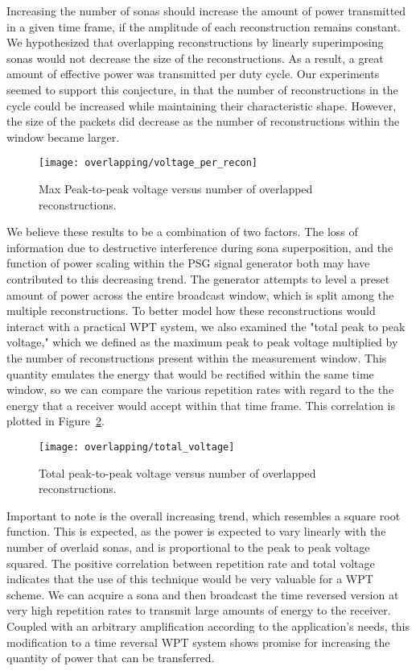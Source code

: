 Increasing the number of sonas should increase the amount of power transmitted in a given time frame, if the amplitude of each reconstruction remains constant. We hypothesized that overlapping reconstructions by linearly superimposing sonas would not decrease the size of the reconstructions. As a result, a great amount of effective power was transmitted per duty cycle. Our experiments seemed to support this conjecture, in that the number of reconstructions in the cycle could be increased while maintaining their characteristic shape. However, the size of the packets did decrease as the number of reconstructions within the window became larger.
\begin{figure}[t]
\centering
\texttt{[image: overlapping/voltage\_per\_recon]}
\caption[Max peak-to-peak voltage from overlapped reconstructions]{Max Peak-to-peak voltage versus number of overlapped reconstructions.}
\label{fig:overlapping-vpp}
\end{figure}
We believe these results to be a combination of two factors. The loss of information due to destructive interference during sona superposition, and the function of power scaling within the PSG signal generator both may have contributed to this decreasing trend. The generator attempts to level a preset amount of power across the entire broadcast window, which is split among the multiple reconstructions. 
To better model how these reconstructions would interact with a practical WPT system, we also examined the "total peak to peak voltage," which we defined as the maximum peak to peak voltage multiplied by the number of reconstructions present within the measurement window. This quantity emulates the energy that would be rectified within the same time window, so we can compare the various repetition rates with regard to the the energy that a receiver would accept within that time frame. This correlation is plotted in Figure~\ref{fig:overlapping-total-voltage}.

\begin{figure}[t]
\centering
\texttt{[image: overlapping/total\_voltage]}
\caption[Total peak-to-peak voltage from overlapped reconstructions]{Total peak-to-peak voltage versus number of overlapped reconstructions.}
\label{fig:overlapping-total-voltage}
\end{figure}

Important to note is the overall increasing trend, which resembles a square root function. This is expected, as the power is expected to vary linearly with the number of overlaid sonas, and is proportional to the peak to peak voltage squared. The positive correlation between repetition rate and total voltage indicates that the use of this technique would be very valuable for a WPT scheme. We can acquire a sona and then broadcast the time reversed version at very high repetition rates to transmit large amounts of energy to the receiver. Coupled with an arbitrary amplification according to the application's needs, this modification to a time reversal WPT system shows promise for increasing the quantity of power that can be transferred.
